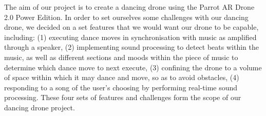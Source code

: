 The aim of our project is to create a dancing drone using the Parrot AR Drone 2.0 Power Edition. In order to set ourselves some challenges with our dancing drone, we decided on a set features that we would want our drone to be capable, including: (1) executing dance moves in synchronisation with music as amplified through a speaker, (2) implementing sound processing to detect beats within the music, as well as different sections and moods within the piece of music to determine which dance move to next execute, (3) confining the drone to a volume of space within which it may dance and move, so as to avoid obstacles, (4) responding to a song of the user's choosing by performing real-time sound processing. These four sets of features and challenges form the scope of our dancing drone project.